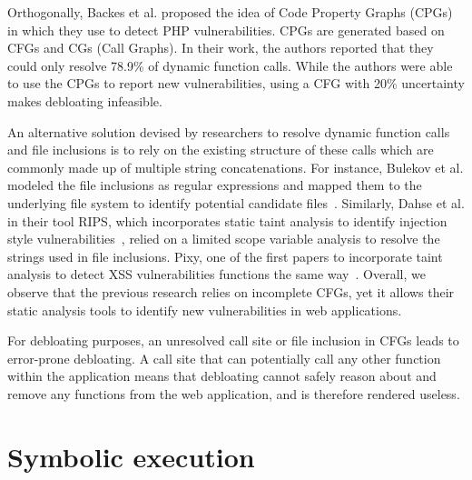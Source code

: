 Orthogonally, Backes et al. proposed the idea of Code Property Graphs (CPGs) in which they use to detect PHP vulnerabilities. 
CPGs are generated based on CFGs and CGs (Call Graphs). 
In their work, the authors reported that they could only resolve 78.9\% of dynamic function calls. 
While the authors were able to use the CPGs to report new vulnerabilities, using a CFG with 20\% uncertainty makes debloating infeasible. 

An alternative solution devised by researchers to resolve dynamic function calls and file inclusions is to rely on the existing structure of these calls which are commonly made up of multiple string concatenations. 
For instance, Bulekov et al. modeled the file inclusions as regular expressions and mapped them to the underlying file system to identify potential candidate files~\cite{saphire}. 
Similarly, Dahse et al. in their tool RIPS, which incorporates static taint analysis to identify injection style vulnerabilities~\cite{dahse2010rips}, relied on a limited scope variable analysis to resolve the strings used in file inclusions. 
Pixy, one of the first papers to incorporate taint analysis to detect XSS vulnerabilities functions the same way~\cite{jovanovic2006pixy}. 
Overall, we observe that the previous research relies on incomplete CFGs, yet it allows their static analysis tools to identify new vulnerabilities in web applications.

For debloating purposes, an unresolved call site or file inclusion in CFGs leads to error-prone debloating. 
A call site that can potentially call any other function within the application means that debloating cannot safely reason about and remove any functions from the web application, and is therefore rendered useless. 

\section{Symbolic execution}

